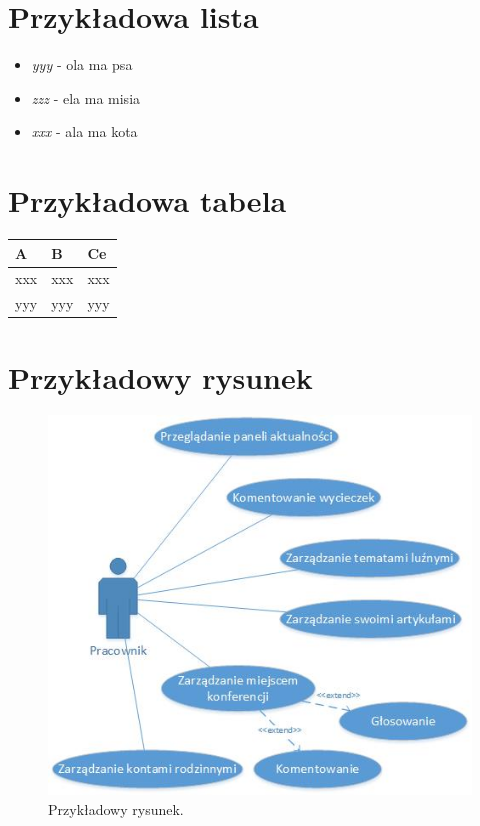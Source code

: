 ﻿\section{Przykładowa lista}
\suppressfloats[t]
\begin{itemize}
  \item \textit{yyy} - ola ma psa
  \item \textit{zzz} - ela ma misia
  \item \textit{xxx} - ala ma kota
\end{itemize}



\section{Przykładowa tabela}

\begin{tabularx}{\textwidth}{X|l|X}
\hline
\textbf{A} & \textbf{B} & \textbf{Ce} \\ \hline
xxx         & xxx         & xxx          \\ \hline
yyy          &yyy         & yyy            \\ \hline
\end{tabularx}

\section{Przykładowy rysunek}

\begin{figure}[!tb]
    \centering
    \includegraphics{pracownik.jpg}
    \caption{Przykładowy rysunek.}
    \label{fig:pracownik}
\end{figure}

\section{}